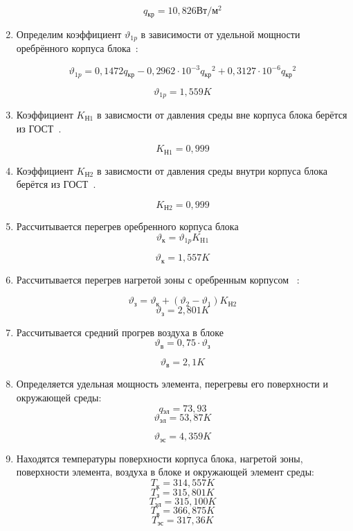 \begin{enumerate}[label={\arabic*.}]
    $$q\mathrm{_{кр}} = 10,826 \mathrm{Вт/м^2}$$

\item
    Определим коэффициент $\vartheta_{1p}$ в зависимости от удельной
    мощности оребрённого корпуса блока~\cite{Rotkop1976}:

\begin{equation}
\vartheta_{1p} = 0,1472q\mathrm{_{кр}} - 0,2962 \cdot 10^{-3}q\mathrm{_{кр}}^2 + 0,3127 \cdot 10^{-6}q\mathrm{_{кр}}^2      
\end{equation}

$$\vartheta_{1p}= 1,559K$$

\item Коэффициент $K\mathrm{_{Н1}}$ в зависмости от давления
  среды вне корпуса блока берётся из ГОСТ~\cite{GOST_15150-69}.

  $$K\mathrm{_{Н1}} = 0,999$$


\item Коэффициент $K\mathrm{_{Н2}}$ в зависмости от давления
  среды внутри корпуса блока берётся из ГОСТ~\cite{GOST_15150-69}.

  $$K\mathrm{_{Н2}} = 0,999$$

\item Рассчитывается перегрев оребренного корпуса блока
  \begin{equation}
    \vartheta\mathrm{_к} =\vartheta{_{1p}}K\mathrm{_{H1}}
  \end{equation}

  $$\vartheta\mathrm{_к} = 1,557K$$

\item Рассчитывается
  перегрев нагретой зоны
  с оребренным корпусом ~\cite{Rotkop1976}:

\begin{equation}
    \vartheta\mathrm{_з} = \vartheta{_к} +(\vartheta_2 - \vartheta_1)K\mathrm{_{Н2}}
  \end{equation}
  $$\vartheta\mathrm{_з} = 2,801K$$

\item Рассчитывается средний прогрев воздуха в блоке
  \begin{equation}
    \vartheta\mathrm{_в} = 0,75 \cdot \vartheta\mathrm{_з}
  \end{equation}
  
  $$\vartheta\mathrm{_в} = 2,1K$$

\item Определяется удельная мощность элемента, перегревы его
    поверхности и окружающей среды:
    $$q\mathrm{_{эл}} =73,93$$
    $$\vartheta\mathrm{_{эл}} = 53,87 K$$

    $$\vartheta\mathrm{_{эс}} = 4,359 K$$

  \item Находятся температуры поверхности корпуса блока, нагретой
зоны, поверхности элемента, воздуха в блоке и окружающей элемент
среды:
$$T\mathrm{_{к}} = 314,557 K$$
$$T\mathrm{_з} = 315,801 K$$
$$T\mathrm{_{эл}} = 315,100 K$$
$$T\mathrm{_{в}} = 366,875 K$$
$$T\mathrm{_{эс}} =317,36 K$$

\end{enumerate}